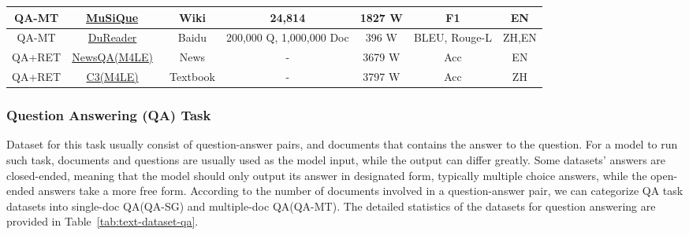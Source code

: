\begin{table*}[t]
\begin{tabular}{c|c|c|c|c|c|c}
QA-MT&
  \href{https://github.com/stonybrooknlp/musique}{MuSiQue}~\cite{trivedi_musique:_2021} &
  Wiki &
  24,814 &
  1827 W&
  F1 &
  EN \\ \hline

QA-MT&
  \href{https://github.com/baidu/DuReader}{DuReader}~\cite{he_dureader:_2017} &
  Baidu &
  200,000 Q, 1,000,000 Doc&
  396 W&
  BLEU, Rouge-L &
  ZH,EN \\ \hline
  
QA+RET &
  \href{https://github.com/KwanWaiChung/M4LE}{NewsQA(M4LE)}~\cite{kwan_m4le:_2023} &
  News &
  - &
  3679 W&
  Acc &
  EN \\ \hline

QA+RET &
  \href{https://github.com/KwanWaiChung/M4LE}{C3(M4LE)}~\cite{kwan_m4le:_2023} &
  Textbook&
  - &
  3797 W&
  Acc &
  ZH \\




 \hline
\end{tabular}
\end{table*}



\subsubsection{Question Answering (QA) Task}
Dataset for this task usually consist of question-answer pairs, and documents that contains the answer to the question. For a model to run such task, documents and questions are usually used as the model input, while the output can differ greatly. Some datasets' answers are closed-ended, meaning that the model should only output its answer in designated form, typically multiple choice answers, while the open-ended answers take a more free form. According to the number of documents involved in a question-answer pair, we can categorize QA task datasets into single-doc QA(QA-SG) and multiple-doc QA(QA-MT). The detailed statistics of the datasets for question answering are provided in Table~\ref{tab:text-dataset-qa}.


